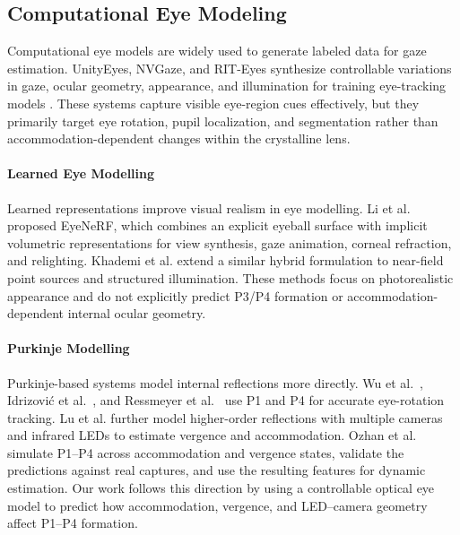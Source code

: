 \documentclass[sigconf, screen, review]{acmart}
\begin{document}
\subsection{Computational Eye Modeling}

Computational eye models are widely used to generate labeled data for gaze estimation. UnityEyes, NVGaze, and RIT-Eyes synthesize controllable variations in gaze, ocular geometry, appearance, and illumination for training eye-tracking models \cite{UnityEyes,NVGaze,RIT-Eyes}. These systems capture visible eye-region cues effectively, but they primarily target eye rotation, pupil localization, and segmentation rather than accommodation-dependent changes within the crystalline lens.
\paragraph{Learned Eye Modelling}
Learned representations improve visual realism in eye modelling. Li et al.~ proposed EyeNeRF, which combines an explicit eyeball surface with implicit volumetric representations for view synthesis, gaze animation, corneal refraction, and relighting. Khademi et al. extend a similar hybrid formulation to near-field point sources and structured illumination. These methods focus on photorealistic appearance and do not explicitly predict P3/P4 formation or accommodation-dependent internal ocular geometry.
\paragraph{Purkinje Modelling}
Purkinje-based systems model internal reflections more directly. Wu et al.~, Idrizovi\'{c} et al.~, and Ressmeyer et al.~ use P1 and P4 for accurate eye-rotation tracking. Lu et al.  further model higher-order reflections with multiple cameras and infrared LEDs to estimate vergence and accommodation. Ozhan et al.  simulate P1--P4 across accommodation and vergence states, validate the predictions against real captures, and use the resulting features for dynamic estimation. Our work follows this direction by using a controllable optical eye model to predict how accommodation, vergence, and LED--camera geometry affect P1--P4 formation.


\end{document}
